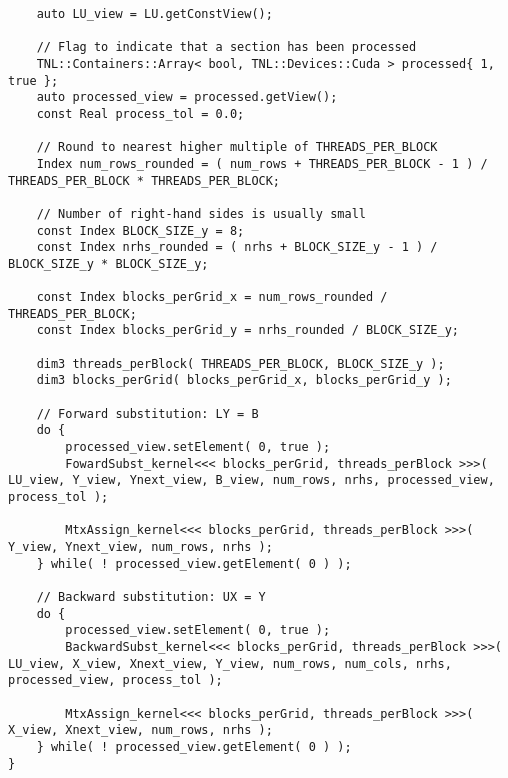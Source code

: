 \begin{lstlisting}
	auto LU_view = LU.getConstView();
	
	// Flag to indicate that a section has been processed
	TNL::Containers::Array< bool, TNL::Devices::Cuda > processed{ 1, true };
	auto processed_view = processed.getView();
	const Real process_tol = 0.0;
	
	// Round to nearest higher multiple of THREADS_PER_BLOCK
	Index num_rows_rounded = ( num_rows + THREADS_PER_BLOCK - 1 ) / THREADS_PER_BLOCK * THREADS_PER_BLOCK;
	
	// Number of right-hand sides is usually small
	const Index BLOCK_SIZE_y = 8;
	const Index nrhs_rounded = ( nrhs + BLOCK_SIZE_y - 1 ) / BLOCK_SIZE_y * BLOCK_SIZE_y;
	
	const Index blocks_perGrid_x = num_rows_rounded / THREADS_PER_BLOCK;
	const Index blocks_perGrid_y = nrhs_rounded / BLOCK_SIZE_y;
	
	dim3 threads_perBlock( THREADS_PER_BLOCK, BLOCK_SIZE_y );
	dim3 blocks_perGrid( blocks_perGrid_x, blocks_perGrid_y );
	
	// Forward substitution: LY = B
	do {
		processed_view.setElement( 0, true );
		FowardSubst_kernel<<< blocks_perGrid, threads_perBlock >>>( LU_view, Y_view, Ynext_view, B_view, num_rows, nrhs, processed_view, process_tol );
		
		MtxAssign_kernel<<< blocks_perGrid, threads_perBlock >>>( Y_view, Ynext_view, num_rows, nrhs );
	} while( ! processed_view.getElement( 0 ) );
	
	// Backward substitution: UX = Y
	do {
		processed_view.setElement( 0, true );
		BackwardSubst_kernel<<< blocks_perGrid, threads_perBlock >>>( LU_view, X_view, Xnext_view, Y_view, num_rows, num_cols, nrhs, processed_view, process_tol );

		MtxAssign_kernel<<< blocks_perGrid, threads_perBlock >>>( X_view, Xnext_view, num_rows, nrhs );
	} while( ! processed_view.getElement( 0 ) );
}
\end{lstlisting}

